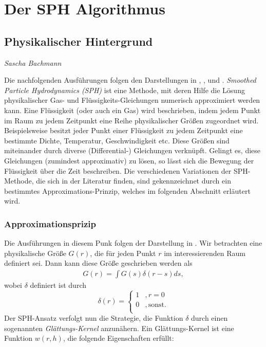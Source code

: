 \chapter{Der SPH Algorithmus}
\thispagestyle{empty}
\label{chap:sph}

\section{Physikalischer Hintergrund}

\begin{center}
\emph{{\small Sascha Bachmann}}
\end{center}

\bigskip

\noindent Die nachfolgenden Ausführungen folgen den Darstellungen in \cite{IntroSPH}, \cite{FlowSPH}, \cite{FluidSim} und \cite{BoundarySPH}. \emph{Smoothed Particle Hydrodynamics (SPH)} ist eine Methode, mit deren Hilfe die Lösung physikalischer Gas- und Flüssigkeits-Gleichungen numerisch approximiert werden kann. Eine Flüssigkeit (oder auch ein Gas) wird beschrieben, indem jedem Punkt im Raum zu jedem Zeitpunkt eine Reihe physikalischer Größen zugeordnet wird. Beispielsweise besitzt jeder Punkt einer Flüssigkeit zu jedem Zeitpunkt eine bestimmte Dichte, Temperatur, Geschwindigkeit etc. Diese Größen sind miteinander durch diverse (Differential-) Gleichungen verknüpft. Gelingt es, diese Gleichungen (zumindest approximativ) zu lösen, so lässt sich die Bewegung der Flüssigkeit über die Zeit beschreiben. Die verschiedenen Variationen der SPH-Methode, die sich in der Literatur finden, sind gekennzeichnet durch ein bestimmtes Approximations-Prinzip, welches im folgenden Abschnitt erläutert wird.

\subsection*{Approximationsprizip} Die Ausführungen in diesem Punk folgen der Darstellung in \cite[S. 89 f]{IntroSPH}. Wir betrachten eine physikalische Größe $G(r)$, die für jeden Punkt $r$ im interessierenden Raum definiert sei. Dann kann diese Größe geschrieben werden als
\begin{align}\label{eqn1}
G(r) = \int G(s)\delta(r - s) ds,
\end{align}
wobei $\delta$ definiert ist durch
\[
\delta(r) = \begin{cases}
1 & , r = 0 \\
0 & , \text{sonst}.\\
\end{cases}
\]
Der SPH-Ansatz verfolgt nun die Strategie, die Funktion $\delta$ durch einen sogenannten \emph{Glättungs-Kernel} anzunähern. Ein Glättungs-Kernel ist eine Funktion $w(r, h)$, die folgende Eigenschaften erfüllt:

